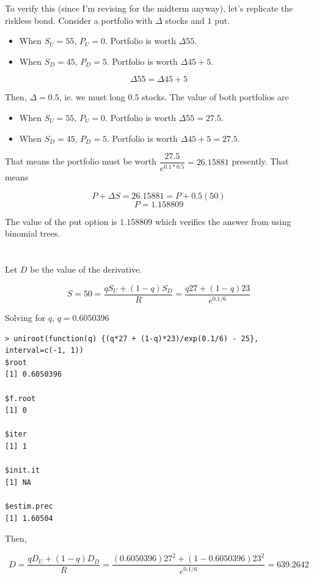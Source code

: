 \documentclass[11pt]{scrartcl}
\begin{document}
To verify this (since I'm revising for the midterm anyway), let's replicate the riskless bond. Consider a portfolio with $\Delta$ stocks and $1$ put.

\begin{itemize}
\item When $S_U = 55$, $P_U = 0$. Portfolio is worth $\Delta 55$.
\item When $S_D = 45$, $P_D = 5$. Portfolio is worth $\Delta 45 + 5$.
\end{itemize}

\[\Delta 55 = \Delta 45 + 5\]

Then, $\Delta = 0.5$, ie. we must long $0.5$ stocks. The value of both portfolios are

\begin{itemize}
\item When $S_U = 55$, $P_U = 0$. Portfolio is worth $\Delta 55 = 27.5$.
\item When $S_D = 45$, $P_D = 5$. Portfolio is worth $\Delta 45 + 5 = 27.5$.
\end{itemize}

That means the portfolio must be worth $\dfrac{27.5}{e^{0.1*0.5}} = 26.15881$ presently. That means

\[P + \Delta S = 26.15881 = P + 0.5(50)\]
\[P = 1.158809\]

The value of the put option is $1.158809$ which verifies the answer from using binomial trees.

\section{}

Let $D$ be the value of the derivative.

\[S = 50 = \frac{qS_U + (1-q)S_D}{R} = \frac{q27 + (1-q)23}{e^{0.1/6}}\]

Solving for $q$, $q = 0.6050396$

\begin{lstlisting}
> uniroot(function(q) {(q*27 + (1-q)*23)/exp(0.1/6) - 25}, interval=c(-1, 1))
$root
[1] 0.6050396

$f.root
[1] 0

$iter
[1] 1

$init.it
[1] NA

$estim.prec
[1] 1.60504
\end{lstlisting}

Then,

\[D = \frac{qD_U + (1-q)D_D}{R} = \frac{(0.6050396)27^2 + (1-0.6050396)23^2}{e^{0.1/6}} = 639.2642\]
\end{document}
